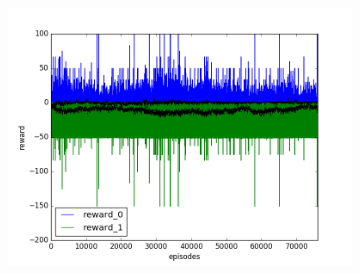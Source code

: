 \begin{figure}[t]
\begin{subfigure}[t]{\figscale\linewidth}
    \includegraphics[width=1.5\textwidth]
    {../results/maddpg_1vs1/reward.png}
    \label{fig:maddpg-1vs1-reward}
  \end{subfigure}


\end{figure}
